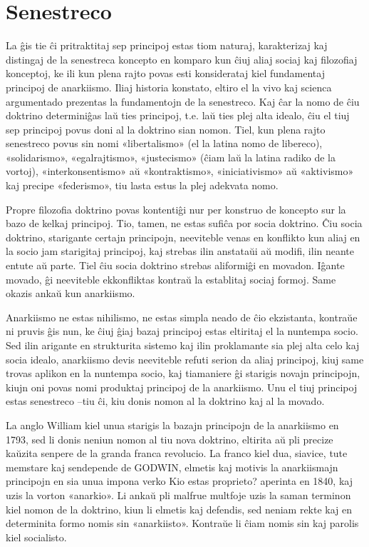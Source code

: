 \section*{Senestreco}
\indent 
La ĝis tie ĉi pritraktitaj sep principoj estas tiom naturaj, karakterizaj kaj distingaj de la senestreca koncepto en komparo kun ĉiuj aliaj sociaj kaj filozofiaj konceptoj, ke ili kun plena rajto povas esti konsiderataj kiel fundamentaj principoj de anarkiismo. Iliaj historia konstato, eltiro el la vivo kaj scienca argumentado prezentas la fundamentojn de la senestreco. Kaj ĉar la nomo de ĉiu doktrino determiniĝas laŭ ties principoj, t.e. laŭ ties plej alta idealo, ĉiu el tiuj sep principoj povus doni al la doktrino sian nomon. Tiel, kun plena rajto senestreco povus sin nomi «libertalismo» (el la latina nomo de libereco), «solidarismo», «egalrajtismo», «justecismo» (ĉiam laŭ la latina radiko de la vortoj), «interkonsentismo» aŭ «kontraktismo», «iniciativismo» aŭ «aktivismo» kaj precipe «federismo», tiu lasta estus la plej adekvata nomo.

Propre filozofia doktrino povas kontentiĝi nur per konstruo de koncepto sur la bazo de kelkaj principoj. Tio, tamen, ne estas sufiĉa por socia doktrino. Ĉiu socia doktrino, starigante certajn principojn, neeviteble venas en konflikto kun aliaj en la socio jam starigitaj principoj, kaj strebas ilin anstataŭi aŭ modifi, ilin neante entute aŭ parte. Tiel ĉiu socia doktrino strebas aliformiĝi en movadon. Iĝante movado, ĝi neeviteble ekkonfliktas kontraŭ la establitaj sociaj formoj. Same okazis ankaŭ kun anarkiismo.

Anarkiismo ne estas nihilismo, ne estas simpla neado de ĉio ekzistanta, kontraŭe ni pruvis ĝis nun, ke ĉiuj ĝiaj bazaj principoj estas eltiritaj el la nuntempa socio. Sed ilin arigante en strukturita sistemo kaj ilin proklamante sia plej alta celo kaj socia idealo, anarkiismo devis neeviteble refuti serion da aliaj principoj, kiuj same trovas aplikon en la nuntempa socio, kaj tiamaniere ĝi starigis novajn principojn, kiujn oni povas nomi produktaj principoj de la anarkiismo. Unu el tiuj principoj estas senestreco –tiu ĉi, kiu donis nomon al la doktrino kaj al la movado.

La anglo William  kiel unua starigis la bazajn principojn de la anarkiismo en 1793, sed li donis neniun nomon al tiu nova doktrino, eltirita aŭ pli precize kaŭzita senpere de la granda franca revolucio. La franco  kiel dua, siavice, tute memstare kaj sendepende de GODWIN, elmetis kaj motivis la anarkiismajn principojn en sia unua impona verko Kio estas proprieto? aperinta en 1840, kaj uzis la vorton «anarkio». Li ankaŭ pli malfrue multfoje uzis la saman terminon kiel nomon de la doktrino, kiun li elmetis kaj defendis, sed neniam rekte kaj en determinita formo nomis sin «anarkiisto». Kontraŭe li ĉiam nomis sin kaj parolis kiel socialisto.

